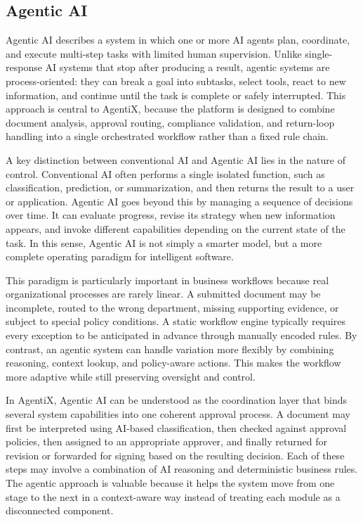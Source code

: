 \documentclass[12pt,oneside,openright,a4paper]{cpe-english-project}
\begin{document}
\vspace{1em}

\subsection{Agentic AI}

Agentic AI describes a system in which one or more AI agents plan,
coordinate, and execute multi-step tasks with limited human supervision.
Unlike single-response AI systems that stop after producing a result,
agentic systems are process-oriented: they can break a goal into
subtasks, select tools, react to new information, and continue until the
task is complete or safely interrupted. This approach is central to
AgentiX, because the platform is designed to combine document analysis,
approval routing, compliance validation, and return-loop handling into a
single orchestrated workflow rather than a fixed rule chain.

A key distinction between conventional AI and Agentic AI lies in the
nature of control. Conventional AI often performs a single isolated
function, such as classification, prediction, or summarization, and then
returns the result to a user or application. Agentic AI goes beyond this
by managing a sequence of decisions over time. It can evaluate progress,
revise its strategy when new information appears, and invoke different
capabilities depending on the current state of the task. In this sense,
Agentic AI is not simply a smarter model, but a more complete operating
paradigm for intelligent software.

This paradigm is particularly important in business workflows because
real organizational processes are rarely linear. A submitted document
may be incomplete, routed to the wrong department, missing supporting
evidence, or subject to special policy conditions. A static workflow
engine typically requires every exception to be anticipated in advance
through manually encoded rules. By contrast, an agentic system can
handle variation more flexibly by combining reasoning, context lookup,
and policy-aware actions. This makes the workflow more adaptive while
still preserving oversight and control.

In AgentiX, Agentic AI can be understood as the coordination layer that
binds several system capabilities into one coherent approval process. A
document may first be interpreted using AI-based classification, then
checked against approval policies, then assigned to an appropriate
approver, and finally returned for revision or forwarded for signing
based on the resulting decision. Each of these steps may involve a
combination of AI reasoning and deterministic business rules. The
agentic approach is valuable because it helps the system move from one
stage to the next in a context-aware way instead of treating each module
as a disconnected component.
\end{document}
